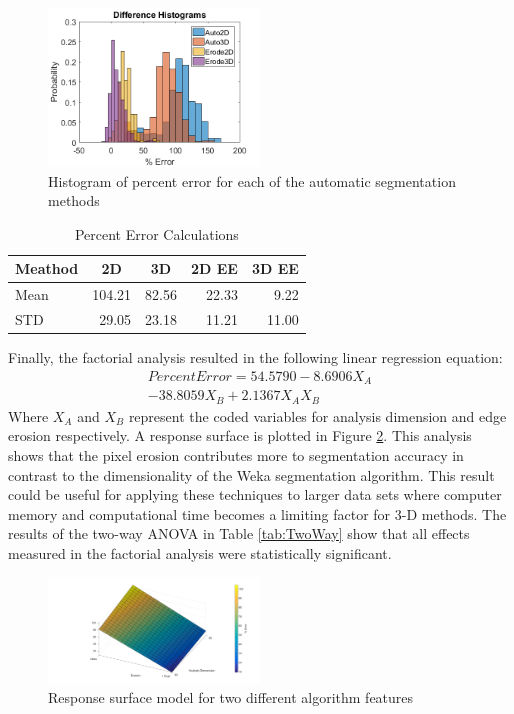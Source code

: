 \documentclass[11pt, twocolumn]{article}
\begin{document}
\begin{figure}[H]
	\centering
	\includegraphics[width=0.5\textwidth]{DifferenceHistograms.png}
	\caption{Histogram of percent error for each of the automatic segmentation methods}
	\label{fig:DiffHist}
\end{figure}
\begin{table}[htbp]
	\centering
	\caption{Percent Error Calculations}
	\begin{tabular}{|l|r|r|r|r|}
		\toprule
		Meathod & \multicolumn{1}{c|}{2D} & \multicolumn{1}{c|}{3D} & \multicolumn{1}{c|}{2D EE} & \multicolumn{1}{c|}{3D EE} \\
		\midrule
		Mean  & 104.21 & 82.56 & 22.33 & 9.22 \\
		\midrule
		STD   & 29.05 & 23.18 & 11.21 & 11.00 \\
		\bottomrule
	\end{tabular}%
	\label{tab:DiffTable}%
\end{table}%

Finally, the factorial analysis resulted in the following linear regression equation:
\begin{multline}
Percent Error= 54.5790 - 8.6906 X_A \\
- 38.8059 X_B + 2.1367 X_A X_B
\end{multline}
Where $X_A$ and $X_B$ represent the coded variables for analysis dimension and edge erosion respectively. A response surface is plotted in Figure \ref{fig:Surf}. This analysis shows that the pixel erosion contributes more to segmentation accuracy in contrast to the dimensionality of the Weka segmentation algorithm. This result could be useful for applying these techniques to larger data sets where computer memory and computational time becomes a limiting factor for 3-D methods. The results of the two-way ANOVA in Table \ref{tab:TwoWay} show that all effects measured in the factorial analysis were statistically significant. 

\begin{figure}[H]
	\centering
	\includegraphics[width=0.5\textwidth]{ResponseSurface.png}
	\caption{Response surface model for two different algorithm features}
	\label{fig:Surf}
\end{figure}
\end{document}
